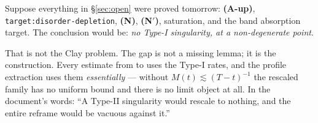 \begin{record}
Suppose everything in \S\ref{sec:open} were proved tomorrow: \textbf{(A-up)},
\texttt{target:disorder-depletion}, \textbf{(N)}, \textbf{(N\('\))},
saturation, and the band absorption target. The conclusion would be:
\emph{no Type-I singularity, at a non-degenerate point}.

\smallskip
That is not the Clay problem. The gap is not a missing lemma; it is the
construction. Every estimate from  to  uses the Type-I rates,
and the profile extraction uses them \emph{essentially} --- without
\(M(t)\lesssim(T-t)^{-1}\) the rescaled family has no uniform bound and there
is no limit object at all. In the document's words: ``A Type-II singularity
would rescale to nothing, and the entire reframe would be vacuous against
it.''
\end{record}

